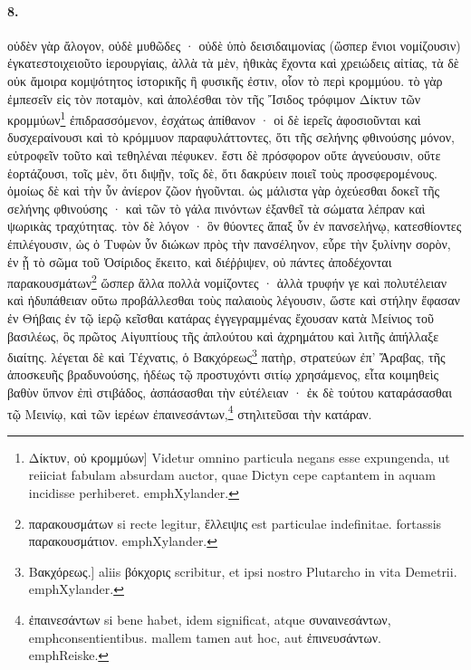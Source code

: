 \documentclass[a4paper, 11pt, oneside, polutonikogreek, german]{article}
\begin{document}
\paragraph{8.}
οὐδὲν γὰρ ἄλογον, οὐδὲ μυθῶδες · οὐδὲ ὑπὸ δεισιδαιμονίας (ὥσπερ ἔνιοι νομίζουσιν) ἐγκατεστοιχειοῦτο ἱερουργίαις, ἀλλὰ τὰ μὲν, ἠθικὰς ἔχοντα καὶ χρειώδεις αἰτίας, τὰ δὲ οὐκ ἄμοιρα κομψότητος ἱστορικῆς ἢ φυσικῆς ἐστιν, οἷον τὸ περὶ κρομμύου. τὸ γὰρ ἐμπεσεῖν εἰς τὸν ποταμὸν, καὶ ἀπολέσθαι τὸν τῆς Ἴσιδος τρόφιμον Δίκτυν τῶν κρομμύων\footnote{Δίκτυν, οὐ κρομμύων] Videtur omnino particula negans esse expungenda, ut reiiciat fabulam absurdam auctor, quae Dictyn cepe captantem in aquam incidisse perhiberet. emph{Xylander.}} ἐπιδρασσόμενον, ἐσχάτως ἀπίθανον · οἱ δὲ ἱερεῖς ἀφοσιοῦνται καὶ δυσχεραίνουσι καὶ τὸ κρόμμυον παραφυλάττοντες, ὅτι τῆς σελήνης φθινούσης μόνον, εὐτροφεῖν τοῦτο καὶ τεθηλέναι πέφυκεν. ἔστι δὲ πρόσφορον οὔτε ἁγνεύουσιν, οὔτε ἑορτάζουσι, τοῖς μὲν, ὅτι διψῇν, τοῖς δὲ, ὅτι δακρύειν ποιεῖ τοὺς προσφερομένους. ὁμοίως δὲ καὶ τὴν ὗν ἀνίερον ζῶον ἡγοῦνται. ὡς μάλιστα γὰρ ὀχεύεσθαι δοκεῖ τῆς σελήνης φθινούσης · καὶ τῶν τὸ γάλα πινόντων ἐξανθεῖ τὰ σώματα λέπραν καὶ ψωρικὰς τραχύτητας. τὸν δὲ λόγον · ὃν θύοντες ἅπαξ ὗν ἐν πανσελήνῳ, κατεσθίοντες ἐπιλέγουσιν, ὡς ὁ Τυφὼν ὗν διώκων πρὸς τὴν πανσέληνον, εὗρε τὴν ξυλίνην σορὸν, ἐν ᾗ τὸ σῶμα τοῦ Ὀσίριδος ἔκειτο, καὶ διέῤῥιψεν, οὐ πάντες ἀποδέχονται παρακουσμάτων\footnote{παρακουσμάτων si recte legitur, ἔλλειψις est particulae indefinitae. fortassis παρακουσμάτιον. emph{Xylander.}} ὥσπερ ἄλλα πολλὰ νομίζοντες · ἀλλὰ τρυφήν γε καὶ πολυτέλειαν καὶ ἡδυπάθειαν οὕτω προβάλλεσθαι τοὺς παλαιοὺς λέγουσιν, ὥστε καὶ στήλην ἔφασαν ἐν Θήβαις ἐν τῷ ἱερῷ κεῖσθαι κατάρας ἐγγεγραμμένας ἔχουσαν κατὰ Μείνιος τοῦ βασιλέως, ὃς πρῶτος Αἰγυπτίους τῆς ἀπλούτου καὶ ἀχρημάτου καὶ λιτῆς ἀπήλλαξε διαίτης. λέγεται δὲ καὶ Τέχνατις, ὁ Βακχόρεως\footnote{Βακχόρεως.] aliis βόκχορις scribitur, et ipsi nostro Plutarcho in vita Demetrii. emph{Xylander.}} πατὴρ, στρατεύων ἐπ' Ἄραβας, τῆς ἀποσκευῆς βραδυνούσης, ἡδέως τῷ προστυχόντι σιτίῳ χρησάμενος, εἶτα κοιμηθεὶς βαθὺν ὕπνον ἐπὶ στιβάδος, ἀσπάσασθαι τὴν εὐτέλειαν · ἐκ δὲ τούτου καταράσασθαι τῷ Μεινίῳ, καὶ τῶν ἱερέων ἐπαινεσάντων,\footnote{ἐπαινεσάντων si bene habet, idem significat, atque συναινεσάντων, emph{consentientibus}. mallem tamen aut hoc, aut ἐπινευσάντων. emph{Reiske.}} στηλιτεῦσαι τὴν κατάραν.
\end{document}
